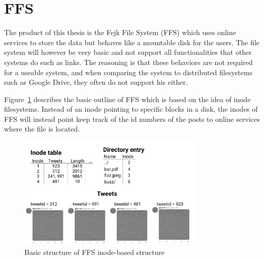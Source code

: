 \section{FFS}
The product of this thesis is the Fejk File System (FFS) which uses online services to store the data but behaves like a mountable disk for the users. The file system will however be very basic and not support all functionalities that other systems do such as links. The reasoning is that these behaviors are not required for a useable system, and when comparing the system to distributed filesystems such as Google Drive, they often do not support his either.

Figure~\ref{fig:ffs_inode_diag} describes the basic outline of FFS which is based on the idea of inode filesystems. Instead of an inode pointing to specific blocks in a disk, the inodes of FFS will instead point keep track of the id numbers of the posts to online services where the file is located. 

\begin{figure}[!ht]
	\begin{center}
	  \includegraphics[width=0.8\textwidth]{figures/ffs_inode_diagram.png}
	\end{center}
	\caption{Basic structure of FFS inode-based structure}
	\label{fig:ffs_inode_diag}
\end{figure}

